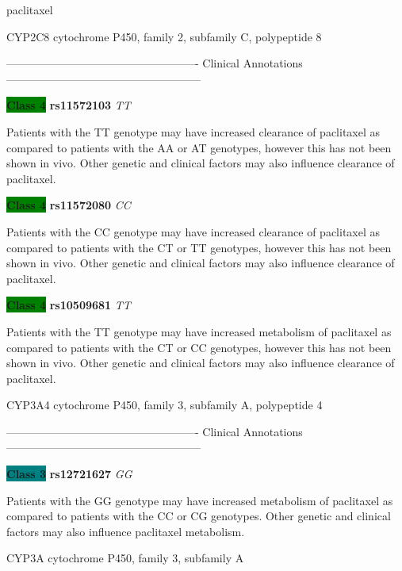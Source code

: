\documentclass{resume} %
\begin{document}
\begin{rSection}{ paclitaxel }
\begin{rSubsection}{ CYP2C8 }{ cytochrome P450, family 2, subfamily C, polypeptide 8 }{}{}
\item[] ---------------------------------------------------- Clinical Annotations -----------------------------------------------------\newline
\item \textbf{\colorbox{green} {Class 4}} \textbf{ rs11572103 } \textit{ TT }
\item[] Patients with the TT genotype may have increased clearance of paclitaxel as compared to patients with the AA or AT genotypes, however this has not been shown in vivo. Other genetic and clinical factors may also influence clearance of paclitaxel.\item \textbf{\colorbox{green} {Class 4}} \textbf{ rs11572080 } \textit{ CC }
\item[] Patients with the CC genotype may have increased clearance of paclitaxel as compared to patients with the CT or TT genotypes, however this has not been shown in vivo. Other genetic and clinical factors may also influence clearance of paclitaxel.\item \textbf{\colorbox{green} {Class 4}} \textbf{ rs10509681 } \textit{ TT }
\item[] Patients with the TT genotype may have increased metabolism of paclitaxel as compared to patients with the CT or CC genotypes, however this has not been shown in vivo. Other genetic and clinical factors may also influence clearance of paclitaxel.
\end{rSubsection}\begin{rSubsection}{ CYP3A4 }{ cytochrome P450, family 3, subfamily A, polypeptide 4 }{}{}
\item[]

\item[] ---------------------------------------------------- Clinical Annotations -----------------------------------------------------\newline
\item \textbf{\colorbox{teal} {Class 3}} \textbf{ rs12721627 } \textit{ GG }
\item[] Patients with the GG genotype may have increased metabolism of paclitaxel as compared to patients with the CC or CG genotypes. Other genetic and clinical factors may also influence paclitaxel metabolism.
\end{rSubsection}\begin{rSubsection}{ CYP3A }{ cytochrome P450, family 3, subfamily A }{}{}
\item[]


\end{rSubsection}
\end{rSection}
\end{document}
